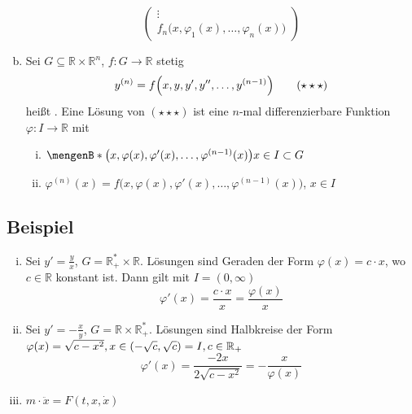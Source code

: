 \begin{enumerate}[a)]
\[\begin{pmatrix}
			\vdots \\
			f_n\big(x, \varphi_1(x), \ldots , \varphi_n(x)\big)
		\end{pmatrix}
	\]
	\item Sei $G \subseteq \mathds{R} \times \mathds{R}^n$, $f : G \to \mathds{R}$ stetig
	\[
		y^{(n)} = f \enbrace*{x,y,y',y'', \ldots , y^{(n-1)}} \tag{$\star\star\star$}
	\]
	heißt . Eine Lösung von $(\star \star \star)$ ist eine $n$-mal differenzierbare
	Funktion $\varphi : I \to \mathds{R}$ mit
	\begin{enumerate}[(i)]
		\item $\set[\big(x, \varphi(x), \varphi'(x), \ldots , \varphi^{(n-1)}(x)\big)]{x \in I} \subset G $
		\item $\varphi^{(n)}(x) = f\Big(x, \varphi(x), \varphi'(x), \ldots , \varphi^{(n-1)} (x)\Big)$, $x \in I$
	\end{enumerate}
\end{enumerate}

\subsection[Beispiel: Einfache Differentialgleichungen]{Beispiel} %
\label{sub:12}
\begin{enumerate}[(i)]
	\item \label{enum:12:1} Sei $y'= \frac{y}{x} $, $G= \mathds{R}_+^* \times \mathds{R}$. Lösungen sind Geraden der Form 
	$\varphi(x) = c \cdot x$, wo $c \in \mathds{R}$ konstant ist. Dann gilt mit $I = (0, \infty)$
	\[
		\varphi'(x) = \frac{c \cdot x}{x} = \frac{\varphi(x)}{x} 
	\]
	\item \label{enum:12:2} Sei $y'= - \frac{x}{y} $, $G = \mathds{R} \times \mathds{R}_+^*$. Lösungen sind Halbkreise der Form 
	$\varphi(x) = \sqrt{c-x^2} , x \in \enbrace*{- \sqrt{c}, \sqrt{c}}=I , c \in \mathds{R}_+ $
	\[
		\varphi'(x) = \frac{-2x}{2 \sqrt{c-x^2}  } = - \frac{x}{\varphi(x)}  
	\]
	\item $m \cdot \ddot x = F(t,x, \dot x)$ 
\end{enumerate}

